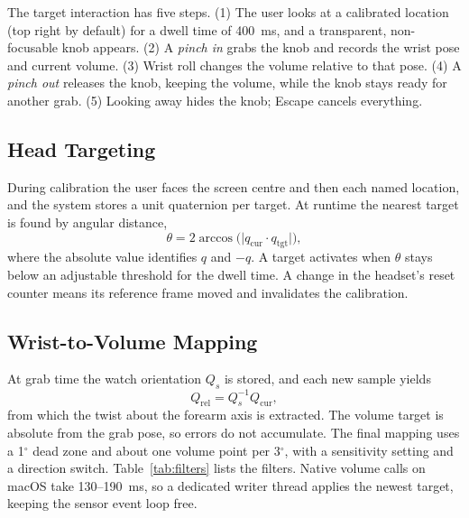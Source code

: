The target interaction has five steps. (1) The user looks at a calibrated location (top right by default) for a dwell time of 400~ms, and a transparent, non-focusable knob appears. (2) A \emph{pinch in} grabs the knob and records the wrist pose and current volume. (3) Wrist roll changes the volume relative to that pose. (4) A \emph{pinch out} releases the knob, keeping the volume, while the knob stays ready for another grab. (5) Looking away hides the knob; Escape cancels everything.

\subsection{Head Targeting}

During calibration the user faces the screen centre and then each named location, and the system stores a unit quaternion per target. At runtime the nearest target is found by angular distance,
\begin{equation}
  \theta = 2\arccos\bigl(\lvert q_{\mathrm{cur}} \cdot q_{\mathrm{tgt}} \rvert\bigr),
  \label{eq:angle}
\end{equation}
where the absolute value identifies $q$ and $-q$. A target activates when $\theta$ stays below an adjustable threshold for the dwell time. A change in the headset's reset counter means its reference frame moved and invalidates the calibration.

\subsection{Wrist-to-Volume Mapping}

At grab time the watch orientation $Q_s$ is stored, and each new sample yields
\begin{equation}
  Q_{\mathrm{rel}} = Q_s^{-1} Q_{\mathrm{cur}},
  \label{eq:qrel}
\end{equation}
from which the twist about the forearm axis is extracted. The volume target is absolute from the grab pose, so errors do not accumulate. The final mapping uses a 1$^\circ$ dead zone and about one volume point per 3$^\circ$, with a sensitivity setting and a direction switch. Table~\ref{tab:filters} lists the filters. Native volume calls on macOS take 130--190~ms, so a dedicated writer thread applies the newest target, keeping the sensor event loop free.

